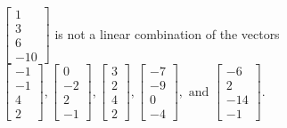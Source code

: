 \begin{exerciseAnswer}
\begin{enumerate}[(a)]
\( \left[\begin{array}{c}
1 \\
3 \\
6 \\
-10
\end{array}\right] \) is not a linear combination of the vectors \( \left[\begin{array}{c}
-1 \\
-1 \\
4 \\
2
\end{array}\right] , \left[\begin{array}{c}
0 \\
-2 \\
2 \\
-1
\end{array}\right] , \left[\begin{array}{c}
3 \\
2 \\
4 \\
2
\end{array}\right] , \left[\begin{array}{c}
-7 \\
-9 \\
0 \\
-4
\end{array}\right] , \text{ and } \left[\begin{array}{c}
-6 \\
2 \\
-14 \\
-1
\end{array}\right] \). 


\end{enumerate}
    
\end{exerciseAnswer}
    
